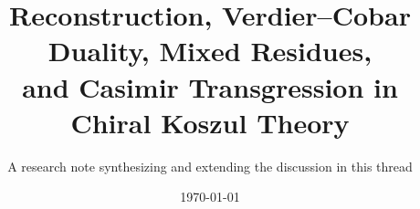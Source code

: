 \label{chap:chiral-koszul-casimir-transgression}


\providecommand{\Bbar}{\overline{B}}
\providecommand{\Cob}{\Omega}
\providecommand{\D}{\mathbb D}
\providecommand{\Ran}{\operatorname{Ran}}
\providecommand{\ch}{\mathrm{ch}}
\providecommand{\otch}{\otimes_{\ch}}
\providecommand{\Sym}{\operatorname{Sym}}
\providecommand{\Spec}{\operatorname{Spec}}
\providecommand{\gr}{\operatorname{gr}}
\providecommand{\Vir}{\operatorname{Vir}}
\providecommand{\Hom}{\operatorname{Hom}}
\providecommand{\MC}{\operatorname{MC}}
\providecommand{\cont}{\mathrm{cont}}
\providecommand{\Ann}{\operatorname{Ann}}
\providecommand{\id}{\mathrm{id}}
\providecommand{\g}{\mathfrak g}
\providecommand{\p}{\mathfrak p}
\providecommand{\hh}{h^\vee}
\providecommand{\C}{\mathbb C}
\providecommand{\wt}{\operatorname{wt}}
\providecommand{\Kcpx}{\mathsf K}
\providecommand{\Qcpx}{\mathsf Q}
\providecommand{\Lan}{\mathscr L}

\title{Reconstruction, Verdier--Cobar Duality, Mixed Residues,\\
and Casimir Transgression in Chiral Koszul Theory}
\author{A research note synthesizing and extending the discussion in this thread}
\date{\today}

